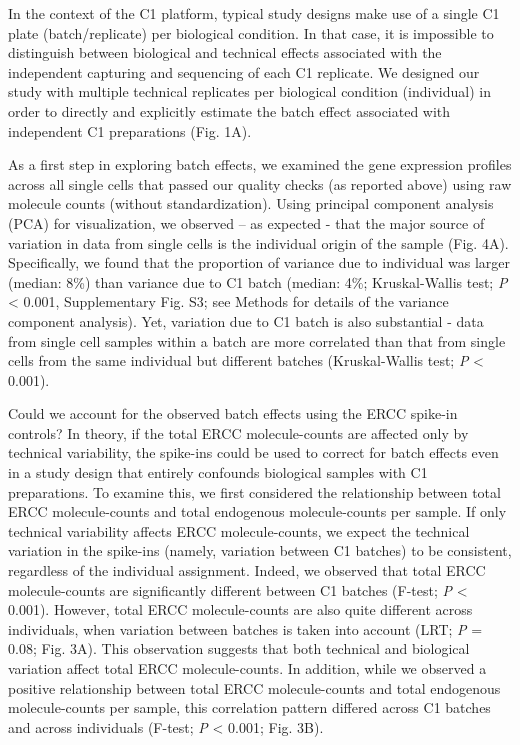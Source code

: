 In the context of the C1 platform, typical study designs make use of a
single C1 plate (batch/replicate) per biological condition. In that
case, it is impossible to distinguish between biological and technical
effects associated with the independent capturing and sequencing of each
C1 replicate. We designed our study with multiple technical replicates
per biological condition (individual) in order to directly and
explicitly estimate the batch effect associated with independent C1
preparations (Fig. 1A).

As a first step in exploring batch effects, we examined the gene
expression profiles across all single cells that passed our quality
checks (as reported above) using raw molecule counts (without
standardization). Using principal component analysis (PCA) for
visualization, we observed -- as expected - that the major source of
variation in data from single cells is the individual origin of the
sample (Fig. 4A). Specifically, we found that the proportion of variance
due to individual was larger (median: 8\%) than variance due to C1 batch
(median: 4\%; Kruskal-Wallis test; \emph{P} \textless{} 0.001,
Supplementary Fig. S3; see Methods for details of the variance component
analysis). Yet, variation due to C1 batch is also substantial - data
from single cell samples within a batch are more correlated than that
from single cells from the same individual but different batches
(Kruskal-Wallis test; \emph{P} \textless{} 0.001).

Could we account for the observed batch effects using the ERCC spike-in
controls? In theory, if the total ERCC molecule-counts are affected only
by technical variability, the spike-ins could be used to correct for
batch effects even in a study design that entirely confounds biological
samples with C1 preparations. To examine this, we first considered the
relationship between total ERCC molecule-counts and total endogenous
molecule-counts per sample. If only technical variability affects ERCC
molecule-counts, we expect the technical variation in the spike-ins
(namely, variation between C1 batches) to be consistent, regardless of
the individual assignment. Indeed, we observed that total ERCC
molecule-counts are significantly different between C1 batches (F-test;
\emph{P} \textless{} 0.001). However, total ERCC molecule-counts are
also quite different across individuals, when variation between batches
is taken into account (LRT; \emph{P} = 0.08; Fig. 3A). This observation
suggests that both technical and biological variation affect total ERCC
molecule-counts. In addition, while we observed a positive relationship
between total ERCC molecule-counts and total endogenous molecule-counts
per sample, this correlation pattern differed across C1 batches and
across individuals (F-test; \emph{P} \textless{} 0.001; Fig. 3B).

